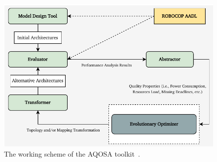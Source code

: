 \begin{figure}[ht]
\centering
\includegraphics[width=0.8\columnwidth]{figures/Aqosa_framework.pdf}
\caption{The working scheme of the AQOSA toolkit~\cite{askaripoor2022architecture}.}
\label{fig07}
\end{figure}

